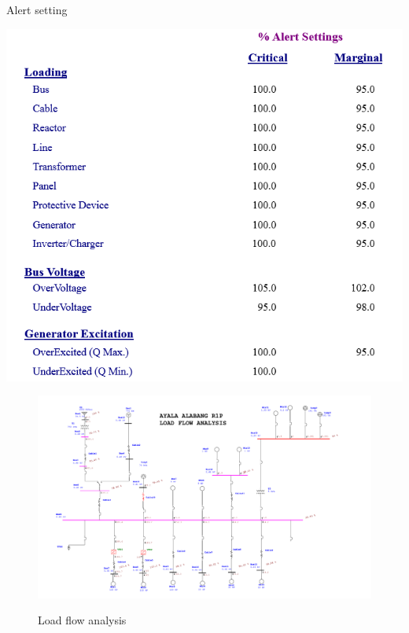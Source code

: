 \begin{table}[]
	\caption{Alert setting}
	\label{tbl_ch04_elecaudit_load_flow_alertsetting01}
	\includegraphics[scale=0.3]{tables/tbl_ch04_elecaudit_load_flow_alertsetting01}
\end{table}


\begin{figure}[]
	\includegraphics[width=\textwidth]{figures/R1P_LF_analysis.pdf} \\
	\caption{Load flow analysis}
	\label{LF_ANALYSIS} 
\end{figure}


